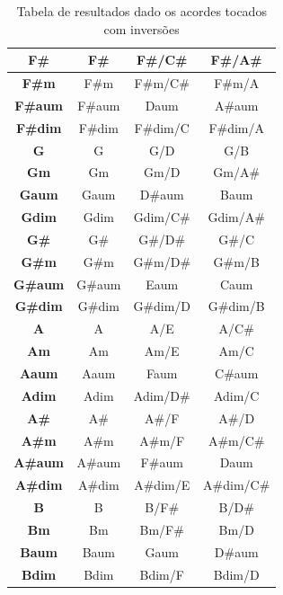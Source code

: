\begin{table}[ht!]
{\begin{tabular}{ | c | c | c | c |}
    \hline
    \textbf{F\#} & F\# & F\#/C\# & F\#/A\# \\
    \hline
    \textbf{F\#m} & F\#m & F\#m/C\# & F\#m/A \\
    \hline
    \textbf{F\#aum} & F\#aum & Daum & A\#aum \\
    \hline
    \textbf{F\#dim} & F\#dim & F\#dim/C & F\#dim/A \\
    \hline
    \textbf{G} & G & G/D & G/B \\
    \hline
    \textbf{Gm} & Gm & Gm/D & Gm/A\# \\
    \hline
    \textbf{Gaum} & Gaum & D\#aum & Baum \\
    \hline
    \textbf{Gdim} & Gdim & Gdim/C\# & Gdim/A\# \\
    \hline
    \textbf{G\#} & G\# & G\#/D\# & G\#/C \\
    \hline
    \textbf{G\#m} & G\#m & G\#m/D\# & G\#m/B \\
    \hline
    \textbf{G\#aum} & G\#aum & Eaum & Caum \\
    \hline
    \textbf{G\#dim} & G\#dim & G\#dim/D & G\#dim/B \\
    \hline
    \textbf{A} & A & A/E & A/C\# \\
    \hline
    \textbf{Am} & Am & Am/E & Am/C \\
    \hline
    \textbf{Aaum} & Aaum & Faum & C\#aum \\
    \hline
    \textbf{Adim} & Adim & Adim/D\# & Adim/C \\
    \hline
    \textbf{A\#} & A\# & A\#/F & A\#/D \\
    \hline
    \textbf{A\#m} & A\#m & A\#m/F & A\#m/C\# \\
    \hline
    \textbf{A\#aum} & A\#aum & F\#aum & Daum \\
    \hline
    \textbf{A\#dim} & A\#dim & A\#dim/E & A\#dim/C\# \\
    \hline
    \textbf{B} & B & B/F\# & B/D\# \\
    \hline
    \textbf{Bm} & Bm & Bm/F\# & Bm/D \\
    \hline
    \textbf{Baum} & Baum & Gaum & D\#aum \\
    \hline
    \textbf{Bdim} & Bdim & Bdim/F & Bdim/D \\
    \hline
  \end{tabular}
  }
  \caption{Tabela de resultados dado os acordes tocados com inversões}
  \label{tab:label_test}
\end{table}
